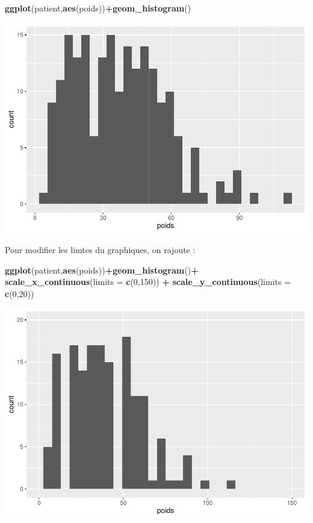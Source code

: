 \documentclass[
]{book}
\newenvironment{Shaded}{\begin{snugshade}}{\end{snugshade}}
\newcommand{\AttributeTok}[1]{\textcolor[rgb]{0.13,0.29,0.53}{#1}}
\newcommand{\DecValTok}[1]{\textcolor[rgb]{0.00,0.00,0.81}{#1}}
\newcommand{\FunctionTok}[1]{\textcolor[rgb]{0.13,0.29,0.53}{\textbf{#1}}}
\newcommand{\NormalTok}[1]{#1}
\newcommand{\SpecialCharTok}[1]{\textcolor[rgb]{0.81,0.36,0.00}{\textbf{#1}}}
\begin{document}
\begin{Shaded}
\begin{Highlighting}[]
\FunctionTok{ggplot}\NormalTok{(patient,}\FunctionTok{aes}\NormalTok{(poids))}\SpecialCharTok{+}\FunctionTok{geom\_histogram}\NormalTok{()}
\end{Highlighting}
\end{Shaded}

\includegraphics{_main_files/figure-latex/ggplot3-1.pdf}

Pour modifier les limtes du graphiques, on rajoute :

\begin{Shaded}
\begin{Highlighting}[]
\FunctionTok{ggplot}\NormalTok{(patient,}\FunctionTok{aes}\NormalTok{(poids))}\SpecialCharTok{+}\FunctionTok{geom\_histogram}\NormalTok{()}\SpecialCharTok{+}
  \FunctionTok{scale\_x\_continuous}\NormalTok{(}\AttributeTok{limits =} \FunctionTok{c}\NormalTok{(}\DecValTok{0}\NormalTok{,}\DecValTok{150}\NormalTok{)) }\SpecialCharTok{+}
  \FunctionTok{scale\_y\_continuous}\NormalTok{(}\AttributeTok{limits =} \FunctionTok{c}\NormalTok{(}\DecValTok{0}\NormalTok{,}\DecValTok{20}\NormalTok{))}
\end{Highlighting}
\end{Shaded}

\includegraphics{_main_files/figure-latex/ggplot4-1.pdf}
\end{document}
